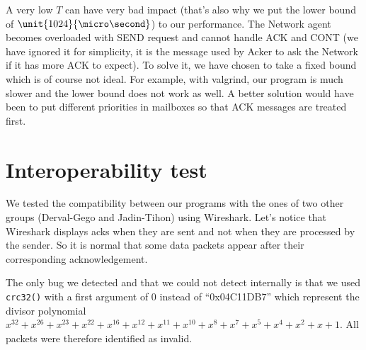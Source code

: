 \documentclass[10pt,a4paper]{article}
\begin{document}
A very low $T$ can have very bad impact (that's also why we put the lower bound of $\unit{1024}{\micro\second}$) to our performance.
The Network agent becomes overloaded with SEND request and cannot handle ACK and CONT (we have ignored it for simplicity, it is the message used by Acker to ask the Network if it has more ACK to expect).
To solve it, we have chosen to take a fixed bound which is of course not ideal.
For example, with valgrind, our program is much slower and the lower bound does not work as well.
A better solution would have been to put different priorities in mailboxes so that ACK messages are treated first.

\section{Interoperability test}

We tested the compatibility between our programs with the ones of two other groups (Derval-Gego and Jadin-Tihon) using Wireshark. Let's notice that Wireshark displays acks when they are sent and not when they are processed by the sender. So it is normal that some data packets appear after their corresponding acknowledgement.

The only bug we detected and that we could not detect internally is that we used \texttt{crc32()} with a first argument of $0$ instead of ``0x04C11DB7'' which represent the divisor polynomial $x^{32} +x^{26} +x^{23} +x^{22} +x^{16} +x^{12} +x^{11} +x^{10} +x^{8} + x^{7} + x^{5} + x^{4} + x^{2} + x + 1$. All packets were therefore identified as invalid.
\end{document}
